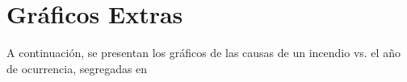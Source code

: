 





\newpage
\section{Gráficos Extras}
A continuación, se presentan los gráficos de las causas de un incendio vs. el año de ocurrencia, segregadas en 